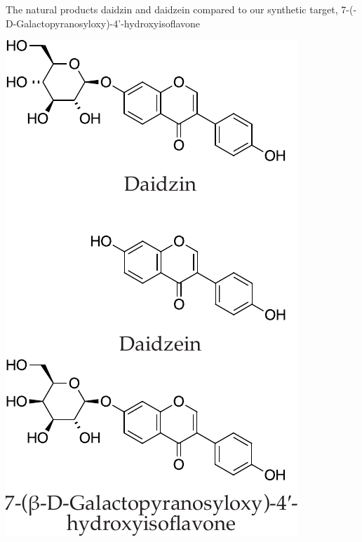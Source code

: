 \documentclass[]{tufte-handout}
\begin{document}
\begin{marginfigure}[5mm]

  \caption[0mm]{The natural products daidzin and daidzein compared to our synthetic target, 7-(\textbeta -D-Galactopyranosyloxy)-4'-hydroxyisoflavone} 
  \vspace{2mm}
    \centering
  \includegraphics[scale=0.6]{Daidzin2.pdf}
  \vspace{5mm}
  \label{fig:fig1}
\end{marginfigure}



\nobibliography{}
\end{document}
